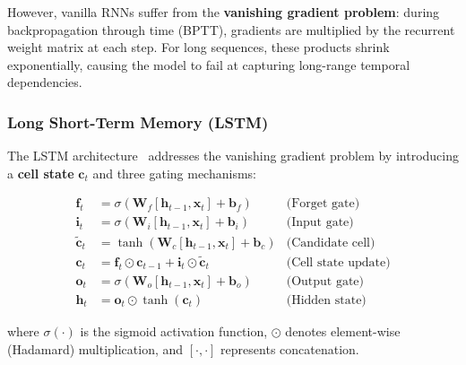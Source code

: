 \documentclass[12pt, a4paper]{article}
\begin{document}
However, vanilla RNNs suffer from the \textbf{vanishing gradient problem}: during backpropagation through time (BPTT), gradients are multiplied by the recurrent weight matrix at each step. For long sequences, these products shrink exponentially, causing the model to fail at capturing long-range temporal dependencies.

\subsubsection{Long Short-Term Memory (LSTM)}

The LSTM architecture~\cite{hochreiter1997lstm} addresses the vanishing gradient problem by introducing a \textbf{cell state} $\mathbf{c}_t$ and three gating mechanisms:

\begin{align}
    \mathbf{f}_t &= \sigma(\mathbf{W}_f [\mathbf{h}_{t-1}, \mathbf{x}_t] + \mathbf{b}_f) & \text{(Forget gate)} \label{eq:forget} \\
    \mathbf{i}_t &= \sigma(\mathbf{W}_i [\mathbf{h}_{t-1}, \mathbf{x}_t] + \mathbf{b}_i) & \text{(Input gate)} \label{eq:input} \\
    \tilde{\mathbf{c}}_t &= \tanh(\mathbf{W}_c [\mathbf{h}_{t-1}, \mathbf{x}_t] + \mathbf{b}_c) & \text{(Candidate cell)} \label{eq:candidate} \\
    \mathbf{c}_t &= \mathbf{f}_t \odot \mathbf{c}_{t-1} + \mathbf{i}_t \odot \tilde{\mathbf{c}}_t & \text{(Cell state update)} \label{eq:cell} \\
    \mathbf{o}_t &= \sigma(\mathbf{W}_o [\mathbf{h}_{t-1}, \mathbf{x}_t] + \mathbf{b}_o) & \text{(Output gate)} \label{eq:output} \\
    \mathbf{h}_t &= \mathbf{o}_t \odot \tanh(\mathbf{c}_t) & \text{(Hidden state)} \label{eq:hidden}
\end{align}

where $\sigma(\cdot)$ is the sigmoid activation function, $\odot$ denotes element-wise (Hadamard) multiplication, and $[\cdot, \cdot]$ represents concatenation.
\end{document}
